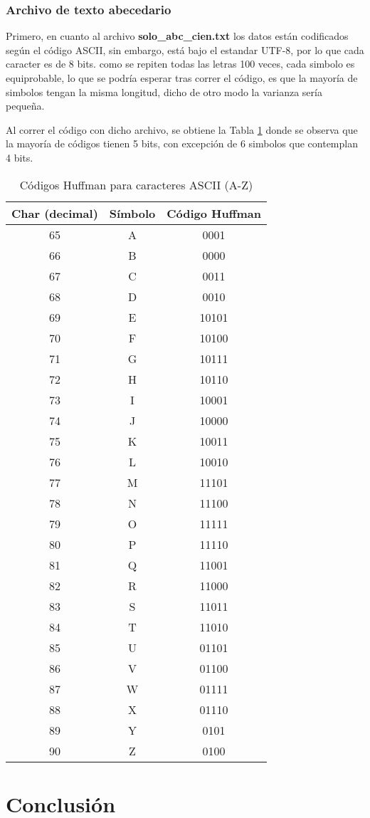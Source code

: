 \documentclass[conference]{IEEEtran}
\numberwithin{equation}{subsection}
\begin{document}
\subsubsection{Archivo de texto abecedario}

Primero, en cuanto al archivo \textbf{solo\_abc\_cien.txt} los datos están codificados según el código ASCII, sin embargo, está bajo el estandar UTF-8, por lo que cada caracter es de 8 bits. como se repiten todas las letras 100 veces, cada simbolo es equiprobable, lo que se podría esperar tras correr el código, es que la mayoría de simbolos tengan la misma longitud, dicho de otro modo la varianza sería pequeña.

Al correr el código con dicho archivo, se obtiene la Tabla \ref{tab:huffman_abc} donde se observa que la mayoría de códigos tienen 5 bits, con excepción de 6 simbolos que contemplan 4 bits.

\begin{table}[h!]
    \centering
    \caption{Códigos Huffman para caracteres ASCII (A-Z)}
    \label{tab:huffman_abc}
    \begin{tabular}{|c|c|c|}
    \hline
    \textbf{Char (decimal)} & \textbf{Símbolo} & \textbf{Código Huffman} \\ \hline
    65 & A & 0001 \\ \hline
    66 & B & 0000 \\ \hline
    67 & C & 0011 \\ \hline
    68 & D & 0010 \\ \hline
    69 & E & 10101 \\ \hline
    70 & F & 10100 \\ \hline
    71 & G & 10111 \\ \hline
    72 & H & 10110 \\ \hline
    73 & I & 10001 \\ \hline
    74 & J & 10000 \\ \hline
    75 & K & 10011 \\ \hline
    76 & L & 10010 \\ \hline
    77 & M & 11101 \\ \hline
    78 & N & 11100 \\ \hline
    79 & O & 11111 \\ \hline
    80 & P & 11110 \\ \hline
    81 & Q & 11001 \\ \hline
    82 & R & 11000 \\ \hline
    83 & S & 11011 \\ \hline
    84 & T & 11010 \\ \hline
    85 & U & 01101 \\ \hline
    86 & V & 01100 \\ \hline
    87 & W & 01111 \\ \hline
    88 & X & 01110 \\ \hline
    89 & Y & 0101 \\ \hline
    90 & Z & 0100 \\ \hline
    \end{tabular}
\end{table}




\section{Conclusión} 


\printbibliography  
\end{document}
